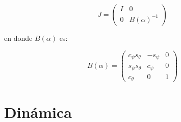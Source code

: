 \begin{multicols*}{3}
            \begin{equation}
                J =
                \begin{pmatrix}
                    I & 0 \\
                    0 & B(\alpha)^{-1}
                \end{pmatrix}
            \end{equation}

            en donde $B(\alpha)$ es:

            \begin{equation}
                B(\alpha) =
                \begin{pmatrix}
                    c_{\psi} s_{\theta} & -s_{\psi} & 0 \\
                    s_{\psi} s_{\theta} & c_{\psi} & 0 \\
                    c_{\theta} & 0 & 1
                \end{pmatrix}
            \end{equation}


    \section{Dinámica}

\end{multicols*}

